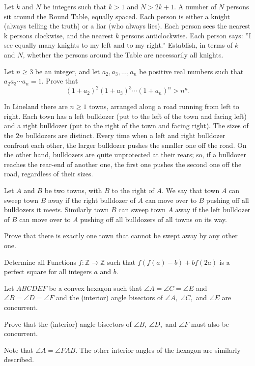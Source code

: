 \documentclass[11pt]{scrartcl}
\begin{document}
\begin{problem}[903527073927588393]
Let $k$ and $N$ be integers such that $k > 1$ and $N > 2k + 1$. A number of $N$ persons sit around the Round Table, equally spaced. Each person is either a knight (always telling the truth) or a liar (who always lies). Each person sees the nearest k persons clockwise, and the nearest $k$ persons anticlockwise. Each person says: ''I see equally many knights to my left and to my right." Establish, in terms of $k$ and $N$, whether the persons around the Table are necessarily all knights.
\end{problem}
\begin{problem}[920619320023657807]
Let $n\ge 3$ be an integer, and let $a_2,a_3,\ldots ,a_n$ be positive real numbers such that $a_{2}a_{3}\cdots a_{n}=1$. Prove that
\[(1 + a_2)^2 (1 + a_3)^3 \dotsm (1 + a_n)^n > n^n.\]
\end{problem}
\begin{problem}[923057111976190018]
In Lineland there are $n\geq1$ towns, arranged along a road running from left to right. Each town has a left bulldozer (put to the left of the town and facing left) and a right bulldozer (put to the right of the town and facing right). The sizes of the $2n$ bulldozers are distinct. Every time when a left and right bulldozer confront each other, the larger bulldozer pushes the smaller one off the road. On the other hand, bulldozers are quite unprotected at their rears; so, if a bulldozer reaches the rear-end of another one, the first one pushes the second one off the road, regardless of their sizes.

Let $A$ and $B$ be two towns, with $B$ to the right of $A$. We say that town $A$ can sweep town $B$ away if the right bulldozer of $A$ can move over to $B$ pushing off all bulldozers it meets. Similarly town $B$ can sweep town $A$ away if the left bulldozer of $B$ can move over to $A$ pushing off all bulldozers of all towns on its way.

Prove that there is exactly one town that cannot be swept away by any other one.
\end{problem}
\begin{problem}[1053677942605812231]
	Determine all Functions $f:\mathbb{Z} \to \mathbb{Z}$ such that $f(f(a)-b)+bf(2a)$ is a perfect square for all integers $a$ and $b$.
\end{problem}
\begin{problem}[1073572769363152471]
	Let $ABCDEF$ be a convex hexagon such that $\angle A = \angle C = \angle E$ and $\angle B = \angle D = \angle F$ and the (interior) angle bisectors of $\angle A, ~\angle C,$ and $\angle E$ are concurrent.

Prove that the (interior) angle bisectors of $\angle B, ~\angle D, $ and $\angle F$ must also be concurrent.

Note that $\angle A = \angle FAB$. The other interior angles of the hexagon are similarly described.
\end{problem}
\end{document}
